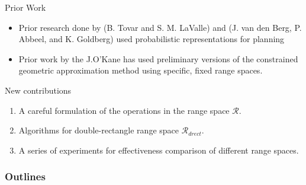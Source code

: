 \documentclass[10pt]{beamer}
\begin{document}
\begin{frame}{Prior Work}
\begin{itemize}
\item Prior research done by (B. Tovar and S. M. LaValle) and (J. van den Berg,
  P. Abbeel, and K. Goldberg)
  used probabilistic representations for planning\\

\item Prior work by the J.O'Kane has used preliminary versions of the
  constrained geometric approximation method using specific, fixed range spaces.
\end{itemize}
New contributions
\begin{enumerate}
\item A careful formulation of the operations in the range space $\mathcal{R}$.
\item Algorithms for double-rectangle range space $\mathcal{R}_{drect}$.
\item A series of experiments for effectiveness comparison of different range spaces.
\end{enumerate}
\end{frame}
\begin{frame}
  \frametitle{Outlines}
  \tableofcontents[]
\end{frame}
\end{document}
